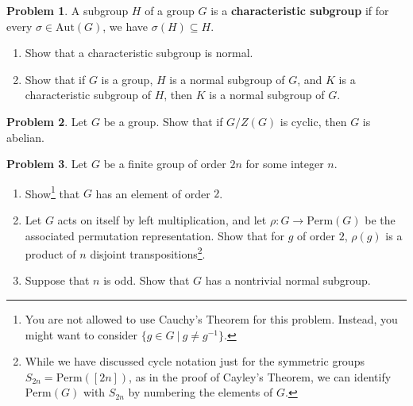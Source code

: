 \documentclass[11pt]{article}
\theoremstyle{definition}
\newtheorem{problem}{Problem}
\begin{document}
      
\smallskip


\begin{problem} A subgroup $H$ of a group $G$ is a \textbf{characteristic subgroup} if for every $\sigma\in \mathrm{Aut}(G)$, we have $\sigma(H) \subseteq H$.
\begin{enumerate}[(3.1)]
\item Show that a characteristic subgroup is normal.
\item Show that if $G$ is a group, $H$ is a normal subgroup of $G$, and $K$ is a characteristic subgroup of $H$, then $K$ is a normal subgroup of $G$.
\end{enumerate}
\end{problem}


\smallskip

\begin{problem} Let $G$ be a group. Show that if $G/Z(G)$ is cyclic, then $G$ is abelian.
\end{problem} 



\smallskip

\begin{problem} Let $G$ be a finite group of order $2n$ for some integer $n$.
\begin{enumerate}[(5.1)]
\item Show\footnote{You are not allowed to use Cauchy's Theorem for this problem. Instead, you might want to consider ${\{g\in G \ | \ g \neq g^{-1}\}}$.} that $G$ has an element of order $2$.
\item Let $G$ acts on itself by left multiplication, and let $\rho:G \to \mathrm{Perm}(G)$ be the associated permutation representation. Show that for $g$ of order $2$, $\rho(g)$ is a product of $n$ disjoint transpositions\footnote{While we have discussed cycle notation just for the symmetric groups $S_{2n} = \mathrm{Perm}([2n])$, as in the proof of Cayley's Theorem, we can identify $\mathrm{Perm}(G)$ with $S_{2n}$ by numbering the elements of $G$.}.
\item Suppose that $n$ is odd. Show that $G$ has a nontrivial normal subgroup.
\end{enumerate}

\end{problem}
\end{document}
